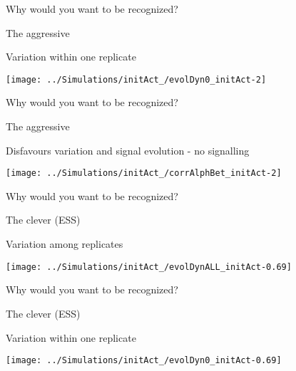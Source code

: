 \documentclass[
  ignorenonframetext,
]{beamer}
\begin{document}
\begin{frame}{Why would you want to be recognized?}
\protect\hypertarget{why-would-you-want-to-be-recognized-6}{}

\begin{block}{The aggressive}

Variation within one replicate

\begin{flushleft}\texttt{[image: ../Simulations/initAct\_/evolDyn0\_initAct-2]} \end{flushleft}

\end{block}

\end{frame}

\begin{frame}{Why would you want to be recognized?}
\protect\hypertarget{why-would-you-want-to-be-recognized-7}{}

\begin{block}{The aggressive}

Disfavours variation and signal evolution - no signalling

\begin{flushleft}\texttt{[image: ../Simulations/initAct\_/corrAlphBet\_initAct-2]} \end{flushleft}

\end{block}

\end{frame}

\begin{frame}{Why would you want to be recognized?}
\protect\hypertarget{why-would-you-want-to-be-recognized-8}{}

\begin{block}{The clever (ESS)}

Variation among replicates

\begin{flushleft}\texttt{[image: ../Simulations/initAct\_/evolDynALL\_initAct-0.69]} \end{flushleft}

\end{block}

\end{frame}

\begin{frame}{Why would you want to be recognized?}
\protect\hypertarget{why-would-you-want-to-be-recognized-9}{}

\begin{block}{The clever (ESS)}

Variation within one replicate

\begin{flushleft}\texttt{[image: ../Simulations/initAct\_/evolDyn0\_initAct-0.69]} \end{flushleft}

\end{block}

\end{frame}
\end{document}
